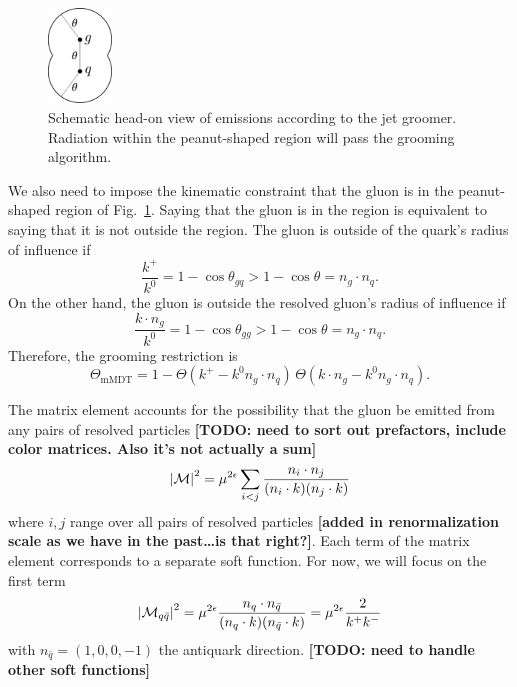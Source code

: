 \documentclass[11pt,twoside,reqno]{amsart}
\theoremstyle{plain}
\theoremstyle{remark}
\theoremstyle{definition}
\theoremstyle{remark}
\theoremstyle{definition}
\theoremstyle{definition}
\newcommand{\cM}{\mathcal{M}}
\newcommand{\mMDT}{\mathrm{mMDT}}
\begin{document}
	\begin{figure}\label{fig:schematic}
		\includegraphics[width=0.15\textwidth]{figures/head_on_schematic.pdf}
		\caption{Schematic head-on view of emissions according to the jet groomer. Radiation within the peanut-shaped region will pass the grooming algorithm.}
	\end{figure}

	We also need to impose the kinematic constraint that the gluon is in the peanut-shaped region of Fig.~\ref{fig:schematic}. Saying that the gluon is in the region is equivalent to saying that it is not outside the region. The gluon is outside of the quark's radius of influence if
	\begin{equation}
		\frac{k^+}{k^0} = 1 - \cos\theta_{gq} > 1 - \cos\theta = n_g \cdot n_q.
	\end{equation}
	On the other hand, the gluon is outside the resolved gluon's radius of influence if
	\begin{equation}
		\frac{k \cdot n_g}{k^0} = 1 - \cos\theta_{gg} > 1 - \cos\theta = n_g \cdot n_q.
	\end{equation}
	Therefore, the grooming restriction is
	\begin{equation}
		\Theta_{\mMDT} = 1 - \Theta(k^+ - k^0 n_g \cdot n_q)\,\Theta(k \cdot n_g - k^0 n_g \cdot n_q).
	\end{equation}

	The matrix element accounts for the possibility that the gluon be emitted from any pairs of resolved particles {\color{red}\textbf{[TODO: need to sort out prefactors, include color matrices. Also it's not actually a sum]}}
	\begin{equation}
		\abs{\cM}^2 = \mu^{2\epsilon}\sum_{i < j} \frac{n_i \cdot n_j}{(n_i \cdot k)(n_j \cdot k)}
	\end{equation}
	where $i, j$ range over all pairs of resolved particles {\color{red}\textbf{[added in renormalization scale as we have in the past\dots is that right?]}}. Each term of the matrix element corresponds to a separate soft function. For now, we will focus on the first term 
	\begin{equation}
		\abs{\cM_{q\bar q}}^2 = \mu^{2\epsilon}\frac{n_q \cdot n_{\bar q}}{(n_q \cdot k)(n_{\bar q}\cdot k)} = \mu^{2\epsilon}\frac{2}{k^+ k^-}
	\end{equation}
	with $n_{\bar q} = (1, 0, 0, -1)$ the antiquark direction. {\color{red}\textbf{[TODO: need to handle other soft functions]}}
\end{document}
